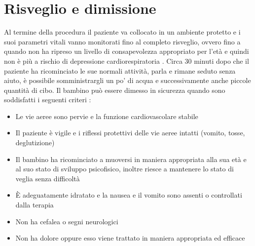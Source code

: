 \section{Risveglio e dimissione}

Al termine della procedura il paziente va collocato in un ambiente protetto e i suoi parametri vitali vanno monitorati fino al completo risveglio, ovvero fino a quando non ha ripreso un livello di consapevolezza appropriato per l'età e quindi non è più a rischio di depressione cardiorespiratoria \cite{Krauss2006}. Circa 30 minuti dopo che il paziente ha ricominciato le sue normali attività, parla e rimane seduto senza aiuto, è possibile somministrargli un po' di acqua e successivamente anche piccole quantità di cibo. Il bambino può essere dimesso in sicurezza quando sono soddisfatti i seguenti criteri \cite{Uptodatesed, Simeupsedazione}: 
\begin{itemize}
    \item Le vie aeree sono pervie e la funzione cardiovascolare stabile
    \item Il paziente è vigile e i riflessi protettivi delle vie aeree intatti (vomito, tosse, deglutizione)
    \item Il bambino ha ricominciato a muoversi in maniera appropriata alla sua età e al suo stato di sviluppo psicofisico, inoltre riesce a mantenere lo stato di veglia senza difficoltà
    \item \`E adeguatamente idratato e la nausea e il vomito sono assenti o controllati dalla terapia
    \item Non ha cefalea o segni neurologici
    \item Non ha dolore oppure esso viene trattato in maniera appropriata ed efficace
\end{itemize}